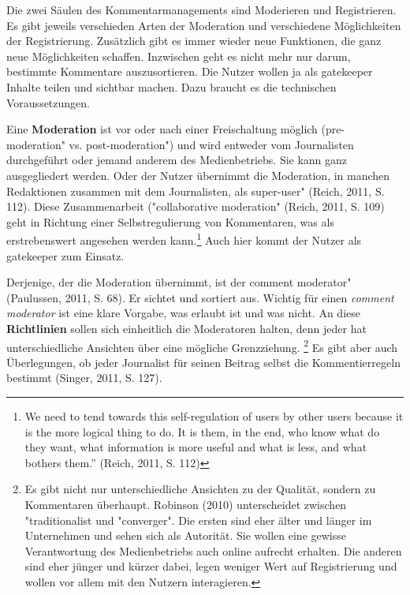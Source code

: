 Die zwei Säulen des Kommentarmanagements sind Moderieren und Registrieren. Es gibt jeweils verschieden Arten der Moderation und verschiedene Möglichkeiten der Registrierung. Zusätzlich gibt es immer wieder neue Funktionen, die ganz neue Möglichkeiten schaffen. Inzwischen geht es nicht mehr nur darum, bestimmte Kommentare auszusortieren. Die Nutzer wollen ja als gatekeeper Inhalte teilen und sichtbar machen. Dazu braucht es die technischen Voraussetzungen.

Eine {\bf Moderation} ist vor oder nach einer Freischaltung möglich (\glqq pre-moderation" vs. \glqq post-moderation") und wird entweder vom Journalisten durchgeführt oder jemand anderem des Medienbetriebs. Sie kann ganz ausgegliedert werden. Oder der Nutzer übernimmt die Moderation, in manchen Redaktionen zusammen mit dem Journalisten, als \glqq super-user" (Reich, 2011, S. 112). Diese Zusammenarbeit ("collaborative moderation" (Reich, 2011, S. 109) geht in Richtung einer Selbstregulierung von Kommentaren, was als erstrebenswert angesehen werden kann.\footnote{\glqq We need to tend towards this self-regulation of users by
other users because it is the more logical thing to do. It is them, in the end, who
know what do they want, what information is more useful and what is less, and
what bothers them.” (Reich, 2011, S. 112)}
Auch hier kommt der Nutzer als gatekeeper zum Einsatz.



Derjenige, der die Moderation übernimmt, ist der \glqq comment moderator" (Paulussen, 2011, S. 68). Er sichtet und sortiert aus. Wichtig für einen {\slshape comment moderator} ist eine klare Vorgabe, was erlaubt ist und was nicht. An diese {\bf Richtlinien} sollen sich einheitlich die Moderatoren halten, denn jeder hat unterschiedliche Ansichten über eine mögliche 
Grenzziehung. \footnote{Es gibt nicht nur unterschiedliche Ansichten zu der Qualität, sondern zu Kommentaren überhaupt. Robinson (2010) unterscheidet zwischen "traditionalist \grqq und "converger". Die ersten sind eher älter und länger im Unternehmen und sehen sich als Autorität. Sie wollen eine gewisse Verantwortung des Medienbetriebs auch online aufrecht erhalten. Die anderen sind eher jünger und kürzer dabei, legen weniger Wert auf Registrierung und wollen vor allem mit den Nutzern interagieren.} Es gibt aber auch Überlegungen, ob jeder Journalist für seinen Beitrag selbst die Kommentierregeln bestimmt (Singer, 2011, S. 127).  






